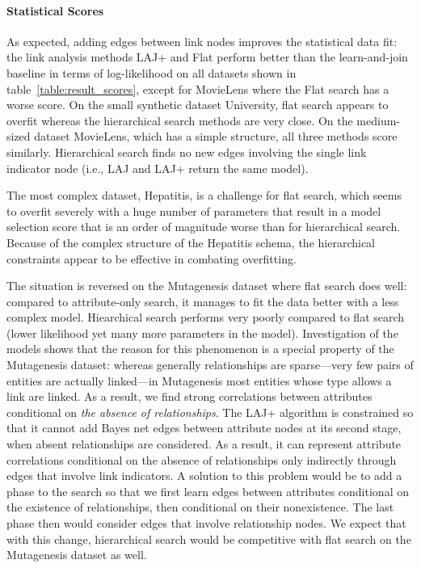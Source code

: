 \documentclass{article}
\begin{document}
\paragraph{Statistical Scores}

As expected, adding edges between link nodes improves the statistical data fit: 
the link analysis methods LAJ+ and Flat perform better than the learn-and-join baseline in terms of log-likelihood on all datasets shown in table~\ref{table:result_scores}, except for MovieLens where the Flat search has a worse score. On the small synthetic dataset University, flat search appears to overfit whereas the hierarchical search methods are very close. On the medium-sized dataset MovieLens, which has a simple structure, all three methods score similarly. Hierarchical search finds no new edges involving the single link indicator node (i.e., LAJ and LAJ+ return the same model). 

The most complex dataset, Hepatitis, is a challenge for flat search, which seems to overfit severely with a huge number of parameters that result in a model selection score that is an order of magnitude worse than for hierarchical search. Because of the complex structure of the Hepatitis schema, the hierarchical constraints appear to be effective in combating overfitting.

The situation is reversed on the Mutagenesis dataset where flat search does well: compared to attribute-only search, it manages to fit the data better with a less complex model. Hiearchical search performs very poorly compared to flat search 
(lower likelihood yet many more parameters in the model). 
Investigation of the models shows that the reason for this phenomenon is a special property of the Mutagenesis dataset: 
whereas generally relationships are sparse---very few pairs of entities are actually linked---in Mutagenesis most entities whose type allows a link are linked. 
As a result, we find strong correlations between attributes conditional on {\em the absence of relationships}. 
The LAJ+ algorithm is constrained so that it cannot add Bayes net edges between attribute nodes at its second stage, when absent relationships are considered. 
As a result, it can represent attribute correlations conditional on the absence of relationships only indirectly through edges that involve link indicators. 
A solution to this problem would be to add a phase to  the search so that we first learn edges between attributes conditional on the existence of relationships, 
then conditional on their nonexistence. The last phase then would consider edges that involve relationship nodes. We expect that with this change, hierarchical search would be competitive with flat search on the Mutagenesis dataset as well.
\end{document}
